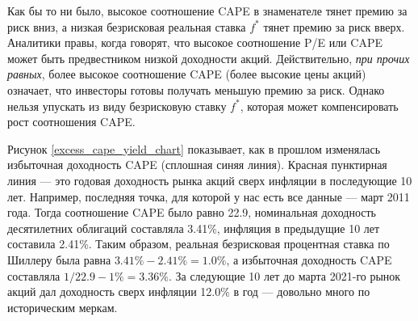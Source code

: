 Как бы то ни было, высокое соотношение CAPE в знаменателе тянет премию за риск 
вниз, а низкая безрисковая реальная ставка $f^*$ тянет премию за риск вверх. 
Аналитики правы, когда говорят, что высокое соотношение P/E или CAPE 
может быть предвестником низкой доходности акций. Действительно, \textit{при 
прочих равных}, более высокое соотношение CAPE (более высокие цены акций) 
означает, что инвесторы готовы получать меньшую премию за риск. Однако нельзя 
упускать из виду безрисковую ставку $f^*$, которая может компенсировать рост 
соотношения CAPE.

Рисунок \ref{excess_cape_yield_chart} показывает, как в прошлом изменялась 
избыточная доходность CAPE (сплошная синяя линия). Красная пунктирная линия 
--- это годовая доходность рынка акций сверх инфляции в последующие 10 лет. 
Например, последняя точка, для которой у нас есть все данные --- март 2011 
года. Тогда соотношение CAPE было равно 22.9, номинальная доходность 
десятилетних облигаций составляла 3.41\%, инфляция в предыдущие 10 лет 
составила 2.41\%. 
Таким образом, реальная безрисковая процентная ставка по Шиллеру была равна 
$3.41\% - 2.41\% = 1.0\%$, а избыточная доходность CAPE составляла $1/22.9 - 
1\% = 3.36\%$. За следующие 10 лет до марта 2021-го рынок акций дал доходность 
сверх инфляции 12.0\% в год --- довольно много по историческим меркам.



